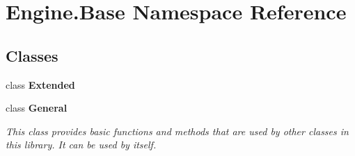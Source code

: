 \hypertarget{namespace_engine_1_1_base}{}\section{Engine.\+Base Namespace Reference}
\label{namespace_engine_1_1_base}
\subsection*{Classes}
\begin{DoxyCompactItemize}
\item 
class {\bfseries Extended}
\item 
class {\bfseries General}
\begin{DoxyCompactList}\small\item\em This class provides basic functions and methods that are used by other classes in this library. It can be used by itself. \end{DoxyCompactList}\end{DoxyCompactItemize}
